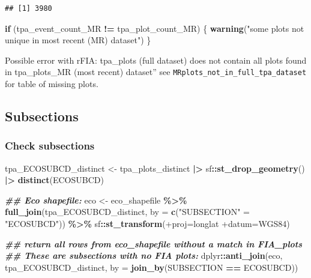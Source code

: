 \documentclass[
]{book}
\newenvironment{Shaded}{\begin{snugshade}}{\end{snugshade}}
\newcommand{\AttributeTok}[1]{\textcolor[rgb]{0.13,0.29,0.53}{#1}}
\newcommand{\ControlFlowTok}[1]{\textcolor[rgb]{0.13,0.29,0.53}{\textbf{#1}}}
\newcommand{\DocumentationTok}[1]{\textcolor[rgb]{0.56,0.35,0.01}{\textbf{\textit{#1}}}}
\newcommand{\FunctionTok}[1]{\textcolor[rgb]{0.13,0.29,0.53}{\textbf{#1}}}
\newcommand{\NormalTok}[1]{#1}
\newcommand{\OtherTok}[1]{\textcolor[rgb]{0.56,0.35,0.01}{#1}}
\newcommand{\SpecialCharTok}[1]{\textcolor[rgb]{0.81,0.36,0.00}{\textbf{#1}}}
\newcommand{\StringTok}[1]{\textcolor[rgb]{0.31,0.60,0.02}{#1}}
\begin{document}
\begin{verbatim}
## [1] 3980
\end{verbatim}

\begin{Shaded}
\begin{Highlighting}[]
\ControlFlowTok{if}\NormalTok{ (tpa\_event\_count\_MR }\SpecialCharTok{!=}\NormalTok{ tpa\_plot\_count\_MR) \{}
  \FunctionTok{warning}\NormalTok{(}\StringTok{"some plots not unique in most recent (MR) dataset"}\NormalTok{)}
\NormalTok{\}}
\end{Highlighting}
\end{Shaded}

Possible error with rFIA: tpa\_plots (full dataset) does not contain all plots found in tpa\_plots\_MR (most recent) dataset'' see \texttt{MRplots\_not\_in\_full\_tpa\_dataset} for table of missing plots.

\hypertarget{subsections}{%
\subsection{Subsections}\label{subsections}}

\hypertarget{check-subsections}{%
\subsubsection{Check subsections}\label{check-subsections}}

\begin{Shaded}
\begin{Highlighting}[]
\NormalTok{tpa\_ECOSUBCD\_distinct }\OtherTok{\textless{}{-}}\NormalTok{ tpa\_plots\_distinct }\SpecialCharTok{|\textgreater{}}
\NormalTok{  sf}\SpecialCharTok{::}\FunctionTok{st\_drop\_geometry}\NormalTok{() }\SpecialCharTok{|\textgreater{}}
  \FunctionTok{distinct}\NormalTok{(ECOSUBCD)}

\DocumentationTok{\#\# Eco shapefile:}
\NormalTok{eco }\OtherTok{\textless{}{-}}\NormalTok{ eco\_shapefile }\SpecialCharTok{\%\textgreater{}\%}
  \FunctionTok{full\_join}\NormalTok{(tpa\_ECOSUBCD\_distinct, }\AttributeTok{by =} \FunctionTok{c}\NormalTok{(}\StringTok{"SUBSECTION"} \OtherTok{=} \StringTok{"ECOSUBCD"}\NormalTok{)) }\SpecialCharTok{\%\textgreater{}\%}
\NormalTok{  sf}\SpecialCharTok{::}\FunctionTok{st\_transform}\NormalTok{(}\StringTok{\textquotesingle{}+proj=longlat +datum=WGS84\textquotesingle{}}\NormalTok{)}

\DocumentationTok{\#\# return all rows from eco\_shapefile without a match in FIA\_plots}
\DocumentationTok{\#\# These are subsections with no FIA plots:}
\NormalTok{dplyr}\SpecialCharTok{::}\FunctionTok{anti\_join}\NormalTok{(eco, tpa\_ECOSUBCD\_distinct, }\AttributeTok{by =} \FunctionTok{join\_by}\NormalTok{(SUBSECTION }\SpecialCharTok{==}\NormalTok{ ECOSUBCD))}
\end{Highlighting}
\end{Shaded}
\end{document}
